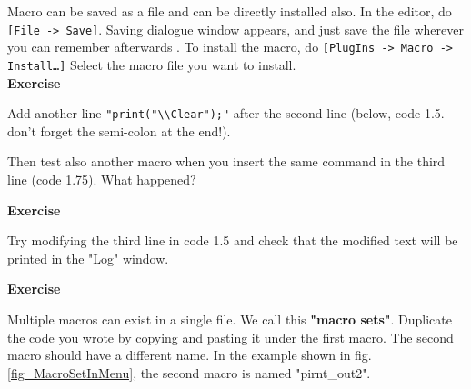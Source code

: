 \documentclass[11pt,a4paper,oneside]{report}
\newenvironment{indentexercise}[1]%
{{\setlength{\leftmargin}{2em}}%
\textbf{Exercise \thesubsection-#1}%
\begin{list}{}%
	\item%
}
{\end{list}}
\newcommand{\ijmenu}[1]{\texttt{\small#1}}
\begin{document}
Macro can be saved as a file and can be directly installed also. 
In the editor, do \ijmenu{[File -> Save]}. Saving dialogue window appears, 
and just save the file wherever you can remember afterwards . 
To install the macro, do \ijmenu{[PlugIns -> Macro -> Install\ldots]} 
Select the macro file you want to install.\\

\begin{indentexercise}{1}
\item Add another line \texttt{"print("\textbackslash{}\textbackslash{}Clear");"} 
after the second line (below, code 1.5. don't forget the semi-colon at the end!). 
\item 
Then test also another macro when you insert the same command in the third line (code 1.75). 
What happened?  
\item 
\end{indentexercise}

\begin{indentexercise}{2}
\item Try modifying the third line in code 1.5 
and check that the modified text will be printed in the "Log" window. \\
\end{indentexercise}

\begin{indentexercise}{3}
\item Multiple macros can exist in a single file. We call this \textbf{"macro sets"}. 
Duplicate the code you wrote by copying and pasting it under the first macro. 
The second macro should have a different name. In the example shown in fig.
\ref{fig_MacroSetInMenu}, the second macro is named "pirnt\_out2".
\end{indentexercise}
\end{document}
